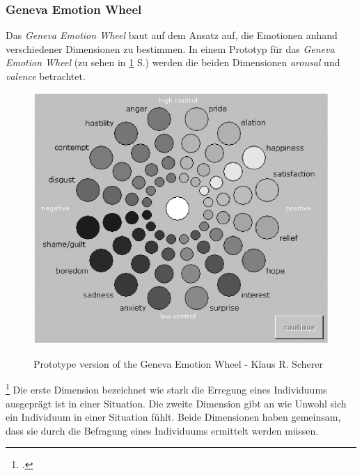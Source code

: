 \subsubsection{Geneva Emotion Wheel}
Das \textit{Geneva Emotion Wheel} baut auf dem Ansatz auf, die Emotionen anhand verschiedener Dimensionen zu bestimmen. In einem Prototyp für das \textit{Geneva Emotion Wheel} (zu sehen in \ref{img:Geneva} S.\pageref{img:Geneva}) werden die beiden Dimensionen \textit{arousal} und \textit{valence} betrachtet.
\begin{figure}[h]
	\centering
	\includegraphics[width=16cm]{Bilder/Geneva-Emotion-Wheel.png}
	\label{img:Geneva}
	\caption[Prototype version of the Geneva Emotion Wheel - Klaus R. Scherer]{Prototype version of the Geneva Emotion Wheel - Klaus R. Scherer\footnotemark}
\end{figure}%
\footcitetext[Vgl.][S.723 Figure 2]{Kla05}
Die erste Dimension bezeichnet wie stark die Erregung eines Individuums ausgeprägt ist in einer Situation. Die zweite Dimension gibt an wie Unwohl sich ein Individuum in einer Situation fühlt. Beide Dimensionen haben gemeinsam, dass sie durch die Befragung eines Individuums ermittelt werden müssen.
